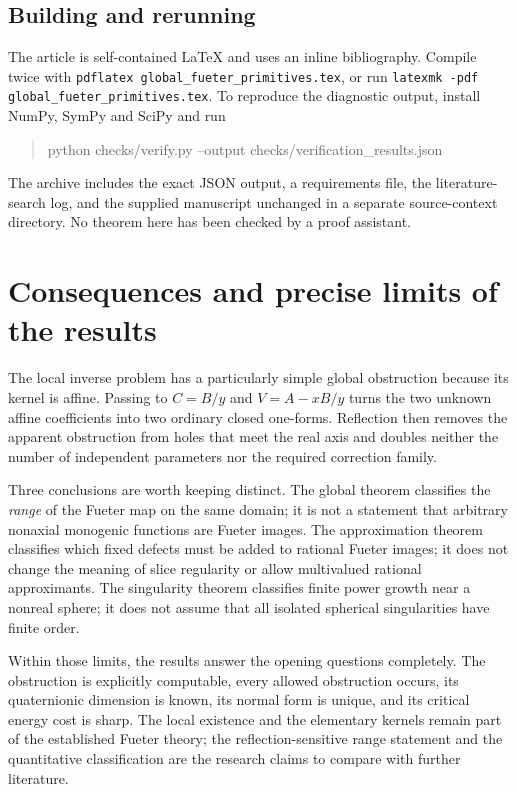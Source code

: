 \documentclass[11pt,a4paper]{article}
\numberwithin{equation}{section}
\theoremstyle{definition}
\theoremstyle{remark}
\begin{document}
\subsection{Building and rerunning}
The article is self-contained LaTeX and uses an inline bibliography.
Compile twice with \texttt{pdflatex global\_fueter\_primitives.tex}, or
run \texttt{latexmk -pdf global\_fueter\_primitives.tex}. To reproduce
the diagnostic output, install NumPy, SymPy and SciPy and run
\begin{quote}\ttfamily\small
python checks/verify.py --output checks/verification\_results.json
\end{quote}
The archive includes the exact JSON output, a requirements file, the
literature-search log, and the supplied manuscript unchanged in a
separate source-context directory. No theorem here has been checked by
a proof assistant.

\section{Consequences and precise limits of the results}
\label{sec:conclusion}
The local inverse problem has a particularly simple global obstruction
because its kernel is affine. Passing to $C=B/y$ and $V=A-xB/y$
turns the two unknown affine coefficients into two ordinary closed
one-forms. Reflection then removes the apparent obstruction from holes
that meet the real axis and doubles neither the number of independent
parameters nor the required correction family.

Three conclusions are worth keeping distinct. The global theorem
classifies the \emph{range} of the Fueter map on the same domain; it is
not a statement that arbitrary nonaxial monogenic functions are Fueter
images. The approximation theorem classifies which fixed defects must
be added to rational Fueter images; it does not change the meaning of
slice regularity or allow multivalued rational approximants. The
singularity theorem classifies finite power growth near a nonreal
sphere; it does not assume that all isolated spherical singularities
have finite order.

Within those limits, the results answer the opening questions
completely. The obstruction is explicitly computable, every allowed
obstruction occurs, its quaternionic dimension is known, its normal
form is unique, and its critical energy cost is sharp. The local
existence and the elementary kernels remain part of the established
Fueter theory; the reflection-sensitive range statement and the
quantitative classification are the research claims to compare with
further literature.
\end{document}
